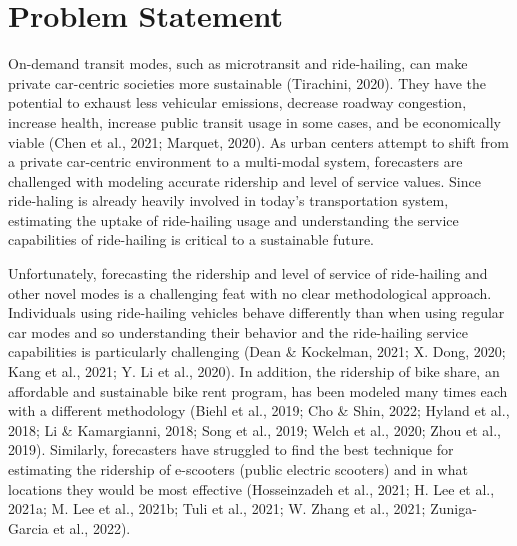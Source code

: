 \documentclass[fancy, masters]{byuthesis}
\begin{document}
\hypertarget{problem-statement}{%
\section{Problem Statement}\label{problem-statement}}

On-demand transit modes, such as microtransit and ride-hailing, can make private car-centric societies more sustainable (Tirachini, 2020). They have the potential to exhaust less vehicular emissions, decrease roadway congestion, increase health, increase public transit usage in some cases, and be economically viable (Chen et al., 2021; Marquet, 2020). As urban centers attempt to shift from a private car-centric environment to a multi-modal system, forecasters are challenged with modeling accurate ridership and level of service values. Since ride-haling is already heavily involved in today's transportation system, estimating the uptake of ride-hailing usage and understanding the service capabilities of ride-hailing is critical to a sustainable future.

Unfortunately, forecasting the ridership and level of service of ride-hailing and other novel modes is a challenging feat with no clear methodological approach. Individuals using ride-hailing vehicles behave differently than when using regular car modes and so understanding their behavior and the ride-hailing service capabilities is particularly challenging (Dean \& Kockelman, 2021; X. Dong, 2020; Kang et al., 2021; Y. Li et al., 2020). In addition, the ridership of bike share, an affordable and sustainable bike rent program, has been modeled many times each with a different methodology (Biehl et al., 2019; Cho \& Shin, 2022; Hyland et al., 2018; Li \& Kamargianni, 2018; Song et al., 2019; Welch et al., 2020; Zhou et al., 2019). Similarly, forecasters have struggled to find the best technique for estimating the ridership of e-scooters (public electric scooters) and in what locations they would be most effective (Hosseinzadeh et al., 2021; H. Lee et al., 2021a; M. Lee et al., 2021b; Tuli et al., 2021; W. Zhang et al., 2021; Zuniga-Garcia et al., 2022).
\end{document}
